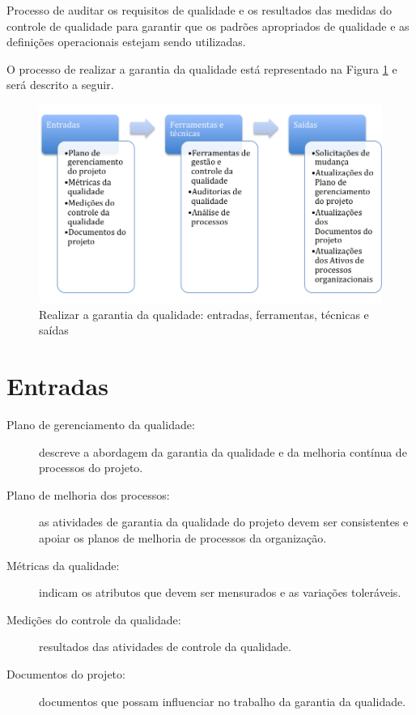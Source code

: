 
Processo de auditar os requisitos de qualidade e os resultados das medidas do controle de qualidade para garantir que os padrões apropriados de qualidade e as definições operacionais estejam sendo utilizadas.

O processo de realizar a garantia da qualidade está representado na Figura \ref{fig:qualidade:gar:efts} e será descrito a seguir.

\begin{figure}[!h]
	\centering
	\includegraphics[scale=0.5]{Figuras/qualidade_efts_realizar.png}
	\caption{Realizar a garantia da qualidade: entradas, ferramentas, técnicas e saídas}
	\label{fig:qualidade:gar:efts}
\end{figure}

\section{Entradas}

\begin{description}

	\item[Plano de gerenciamento da qualidade:] descreve a abordagem da garantia da qualidade e da melhoria contínua de processos do projeto.
	
	\item[Plano de melhoria dos processos:] as atividades de garantia da qualidade do projeto devem ser consistentes e apoiar os planos de melhoria de processos da organização.
	
	\item[Métricas da qualidade:] indicam os atributos que devem ser mensurados e as variações toleráveis.
	
	\item[Medições do controle da qualidade:] resultados das atividades de controle da qualidade.
	
	\item[Documentos do projeto:] documentos que possam influenciar no trabalho da garantia da qualidade.
		
\end{description}

